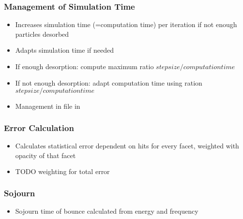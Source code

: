 \subsubsection{Management of Simulation Time}
\begin{itemize}[noitemsep,topsep=0pt]
\item Increases simulation time (=computation time) per iteration if not enough particles desorbed
\item Adapts simulation time if needed
\item If enough desorption: compute maximum ratio $step size/computation time$
\item If not enough desorption: adapt computation time using ration $step size/computation time$
\item Management in  file in 
\end{itemize}

\subsubsection{Error Calculation}
\begin{itemize}[noitemsep,topsep=0pt]
\item Calculates statistical error dependent on hits for every facet, weighted with opacity of that facet
\item TODO weighting for total error
\end{itemize}

\subsubsection{Sojourn}
\begin{itemize}[noitemsep,topsep=0pt]
\item Sojourn time of bounce calculated from energy and frequency
\end{itemize}



